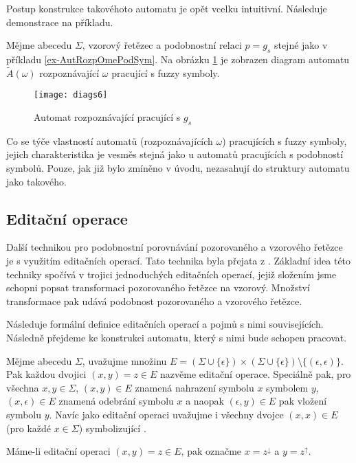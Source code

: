 \documentclass[a4paper,10pt]{article}
\begin{document}
Postup konstrukce takovéhoto automatu je opět vcelku intuitivní. Následuje demonstrace na příkladu.

\begin{example}
 Mějme abecedu $\Sigma$, vzorový řetězec a podobnostní relaci $p = g_s$ stejné jako v příkladu \ref{ex-AutRozpOmePodSym}. Na obrázku \ref{diag-AutRozpOmePraFuzSym} je zobrazen diagram automatu $\widetilde{A}(\omega)$ rozpoznávající $\omega$ pracující s fuzzy symboly.
 
 \begin{figure}
    \texttt{[image: diags6]}
    \caption{Automat rozpoznávající  pracující s $g_s$} \label{diag-AutRozpOmePraFuzSym}
  \end{figure}
\end{example}

Co se týče vlastností automatů (rozpoznávajících $\omega$) pracujících s fuzzy symboly, jejich charakteristika je vesměs stejná jako u automatů pracujících s podobností symbolů. Pouze, jak již bylo zmíněno v úvodu, nezasahují do struktury automatu jako takového.

\subsection{Editační operace}
Další technikou pro podobnostní porovnávání pozorovaného a vzorového řetězce je s využitím editačních operací. Tato technika byla přejata z \cite{AstGonMenGar-FuzzAutEpsMovCmpFuzzMeasBtwStrs}. Základní idea této techniky spočívá v trojici jednoduchých editačních operací, jejiž složením jsme schopni popsat transformaci pozorovaného řetězce na vzorový. Množství transformace pak udává podobnost pozorovaného a vzorového řetězce.

Následuje formální definice editačních operací a pojmů s nimi souvisejících. Následně přejdeme ke konstrukci automatu, který s nimi bude schopen pracovat.

\begin{definition}
Mějme abecedu $\Sigma$, uvažujme množinu $E = (\Sigma \cup \{ \epsilon \}) \times (\Sigma \cup \{ \epsilon \}) \setminus \{ (\epsilon, \epsilon) \}$. Pak každou dvojici $(x, y) = z \in E$ nazvěme editační operace. Speciálně pak, pro všechna $x, y \in \Sigma$, $(x, y) \in E$ znamená nahrazení symbolu $x$ symbolem $y$, $(x, \epsilon) \in E$ znamená odebrání symbolu $x$ a naopak $(\epsilon, y) \in E$ pak vložení symbolu $y$. Navíc jako editační operaci uvažujme i všechny dvojce $(x, x) \in E$ (pro každé $x \in \Sigma$) symbolizující .

Máme-li editační operaci $(x, y) = z \in E$, pak označme $x = z^\downarrow$ a $y = z^\uparrow$.
\end{definition}
\end{document}

